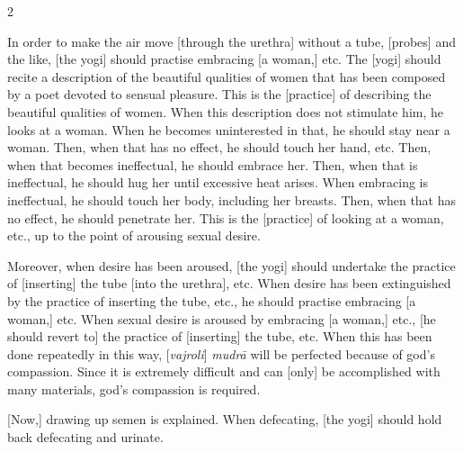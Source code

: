 \begin{nohyp}
\begin{multicols}{2}
\begin{eng}

In order to make the air move [through the urethra] without a tube, [probes] and the like, [the yogi] should practise embracing [a woman,] etc. The [yogi] should recite a description of the beautiful qualities of women that has been composed by a poet devoted to sensual pleasure. This is the [practice] of describing the beautiful qualities of women. When this description does not stimulate him, he looks at a woman. When he becomes uninterested in that, he should stay near a woman. Then, when that has no effect, he should touch her hand, etc. Then, when that becomes ineffectual, he should embrace her. Then, when that is ineffectual, he should hug her until excessive heat arises. When embracing is ineffectual, he should touch her body, including her breasts. Then, when that has no effect, he should penetrate her. This is the [practice] of looking at a woman, etc.,  up to the point of arousing sexual desire.

Moreover, when desire has been aroused, [the yogi] should undertake the practice of [inserting] the tube [into the urethra], etc. When desire has been extinguished by the practice of inserting the tube, etc., he should practise embracing [a woman,] etc. When sexual desire is aroused by embracing [a woman,] etc., [he should revert to] the practice of [inserting] the tube, etc. When this has been done repeatedly in this way, [\textit{vajroli}] \textit{mudrā} will be perfected because of god’s compassion. Since it is extremely difficult and can [only] be accomplished with many materials, god’s compassion is required.
\vskip 7pt


[Now,] drawing up semen is explained. When defecating, [the yogi] should hold back defecating and urinate. 
\end{eng}
\end{multicols}
\end{nohyp}

\newpage

